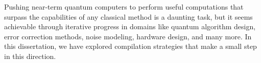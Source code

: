 Pushing near-term quantum computers to perform useful computations that surpass the capabilities of any classical method is a daunting task, but it seems achievable through iterative progress in domains like quantum algorithm design, error correction methods, noise modeling, hardware design, and many more. In this dissertation, we have explored compilation strategies that make a small step in this direction.


